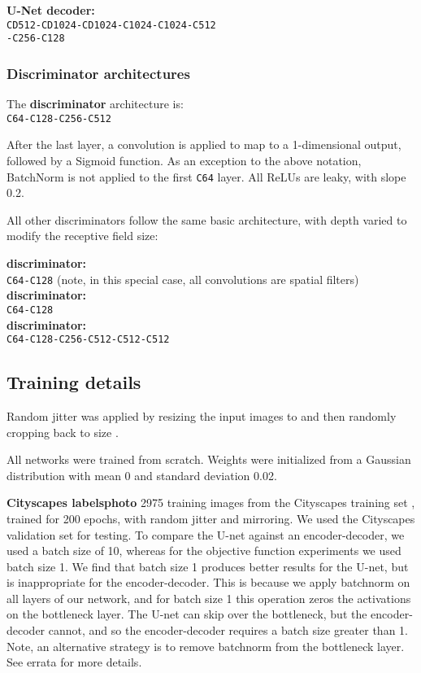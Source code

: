 \documentclass[10pt,twocolumn,letterpaper]{article}
\begin{document}
{\bf U-Net decoder:}\\
\texttt{CD512-CD1024-CD1024-C1024-C1024-C512\\-C256-C128}


\subsubsection{Discriminator architectures}

The {\bf  discriminator} architecture is:\\
\texttt{C64-C128-C256-C512}

After the last layer, a convolution is applied to map to a 1-dimensional output, followed by a Sigmoid function. As an exception to the above notation, BatchNorm is not applied to the first \texttt{C64} layer. All ReLUs are leaky, with slope 0.2.

All other discriminators follow the same basic architecture, with depth varied to modify the receptive field size:

{\bf  discriminator:} \\\texttt{C64-C128} (note, in this special case, all convolutions are  spatial filters)\\
{\bf  discriminator:} \\\texttt{C64-C128}\\
{\bf  discriminator:} \\\texttt{C64-C128-C256-C512-C512-C512}\\



\subsection{Training details}

Random jitter was applied by resizing the  input images to  and then randomly cropping back to size .

All networks were trained from scratch. Weights were initialized from a Gaussian distribution with mean 0 and standard deviation 0.02.

{\bf Cityscapes labelsphoto} 2975 training images from the Cityscapes training set \cite{Cordts2016Cityscapes}, trained for 200 epochs, with random jitter and mirroring. We used the Cityscapes validation set for testing. To compare the U-net against an encoder-decoder, we used a batch size of 10, whereas for the objective function experiments we used batch size 1. We find that batch size 1 produces better results for the U-net, but is inappropriate for the encoder-decoder. This is because we apply batchnorm on all layers of our network, and for batch size 1 this operation zeros the activations on the bottleneck layer. The U-net can skip over the bottleneck, but the encoder-decoder cannot, and so the encoder-decoder requires a batch size greater than 1. Note, an alternative strategy is to remove batchnorm from the bottleneck layer. See errata for more details.
\end{document}
